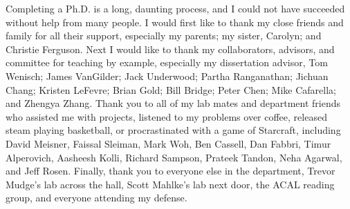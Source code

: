 Completing a Ph.D. is a long, daunting process, and I could not have succeeded without help from many people.
I would first like to thank my close friends and family for all their support, especially my parents; my sister, Carolyn; and Christie Ferguson.
Next I would like to thank my collaborators, advisors, and committee for teaching by example, especially my dissertation advisor, Tom Wenisch; James VanGilder; Jack Underwood; Partha Ranganathan; Jichuan Chang; Kristen LeFevre; Brian Gold; Bill Bridge; Peter Chen; Mike Cafarella; and Zhengya Zhang.
Thank you to all of my lab mates and department friends who assisted me with projects, listened to my problems over coffee, released steam playing basketball, or procrastinated with a game of Starcraft, including David Meisner, Faissal Sleiman, Mark Woh, Ben Cassell, Dan Fabbri, Timur Alperovich, Aasheesh Kolli, Richard Sampson, Prateek Tandon, Neha Agarwal, and Jeff Rosen.
Finally, thank you to everyone else in the department, Trevor Mudge's lab across the hall, Scott Mahlke's lab next door, the ACAL reading group, and everyone attending my defense.
